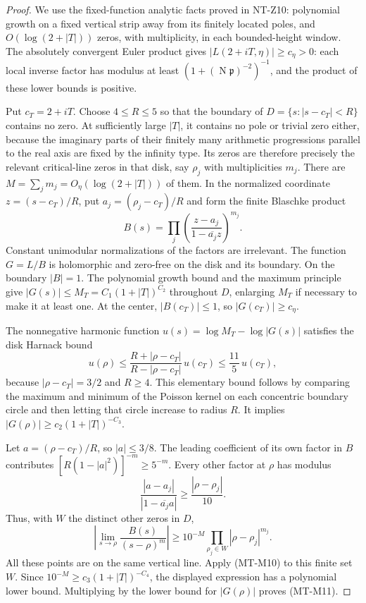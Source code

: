 \documentclass[11pt,a4paper]{article}
\begin{document}
\begin{proof}
We use the fixed-function analytic facts proved in NT-Z10:
polynomial growth on a fixed vertical strip away from its
finitely located poles, and $O(\log(2+|T|))$ zeros, with
multiplicity, in each bounded-height window.
The absolutely convergent Euler product gives
$|L(2+iT,\eta)|\ge c_\eta>0$: each local inverse factor
has modulus at least $(1+(\operatorname N\mathfrak p)^{-2})^{-1}$,
and the product of these lower bounds is positive.

Put $c_T=2+iT$. Choose $4\le R\le5$ so that the boundary of
$D=\{s:|s-c_T|<R\}$ contains no zero. At sufficiently large
$|T|$, it contains no pole or trivial zero either, because
the imaginary parts of their finitely many arithmetic
progressions parallel to the real axis are fixed by the infinity type.
Its zeros are therefore precisely the relevant critical-line
zeros in that disk, say $\rho_j$ with multiplicities $m_j$.
There are
$M=\sum_jm_j=O_\eta(\log(2+|T|))$ of them.
In the normalized coordinate $z=(s-c_T)/R$, put
$a_j=(\rho_j-c_T)/R$ and form the finite Blaschke product
\[
 B(s)=\prod_j
       \left(\frac{z-a_j}{1-\overline{a_j}z}\right)^{m_j}.
\]
Constant unimodular normalizations of the factors are
irrelevant. The function $G=L/B$ is holomorphic and zero-free
on the disk and its boundary. On the boundary $|B|=1$.
The polynomial growth bound and the maximum principle give
$|G(s)|\le M_T=C_1(1+|T|)^{C_2}$ throughout $D$, enlarging
$M_T$ if necessary to make it at least one.
At the center, $|B(c_T)|\le1$, so
$|G(c_T)|\ge c_\eta$.

The nonnegative harmonic function
$u(s)=\log M_T-\log|G(s)|$ satisfies the disk Harnack bound
\[
 u(\rho)\le
 \frac{R+|\rho-c_T|}{R-|\rho-c_T|}\,u(c_T)
 \le\frac{11}{5}\,u(c_T),
\]
because $|\rho-c_T|=3/2$ and $R\ge4$.
This elementary bound follows by comparing the maximum and
minimum of the Poisson kernel on each concentric boundary
circle and then letting that circle increase to radius $R$.
It implies $|G(\rho)|\ge c_2(1+|T|)^{-C_3}$.

Let $a=(\rho-c_T)/R$, so $|a|\le3/8$.
The leading coefficient of its own factor in $B$ contributes
$[R(1-|a|^2)]^{-m}\ge5^{-m}$.
Every other factor at $\rho$ has modulus
\[
 \frac{|a-a_j|}{|1-\overline{a_j}a|}
 \ge\frac{|\rho-\rho_j|}{10}.
\]
Thus, with $W$ the distinct other zeros in $D$,
\[
 \left|\lim_{s\to\rho}\frac{B(s)}{(s-\rho)^m}\right|
 \ge 10^{-M}\prod_{\rho_j\in W}|\rho-\rho_j|^{m_j}.
\]
All these points are on the same vertical line. Apply
(MT-M10) to this finite set $W$. Since
$10^{-M}\ge c_3(1+|T|)^{-C_4}$, the displayed expression
has a polynomial lower bound. Multiplying by the lower bound
for $|G(\rho)|$ proves (MT-M11).
\end{proof}
\end{document}
